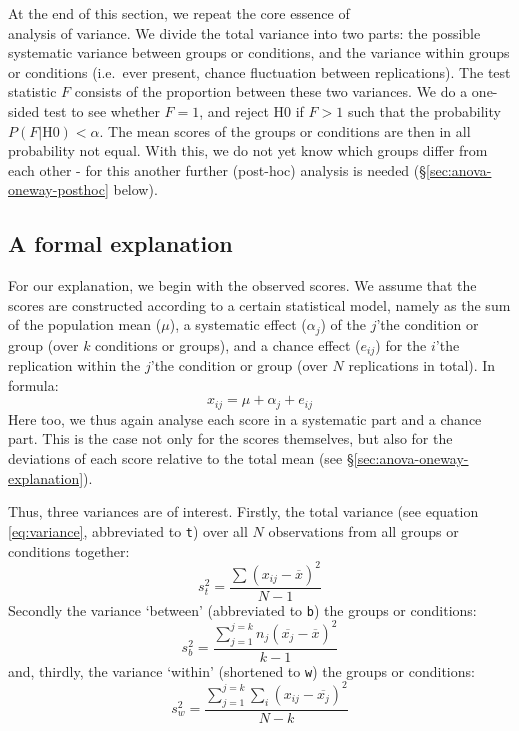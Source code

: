 \documentclass[
]{book}
\begin{document}
At the end of this section, we repeat the core essence of\\
analysis of variance. We divide the total variance into two parts: the
possible systematic variance between groups or conditions, and the
variance within groups or conditions (i.e.~ever present, chance
fluctuation between replications). The test statistic \(F\) consists of the
proportion between these two variances. We do a one-sided test to see
whether \(F=1\), and reject H0 if \(F>1\) such that the probability
\(P(F|\textrm{H0}) < \alpha\). The mean scores of the groups or conditions
are then in all probability not equal. With this, we do not yet know
which groups differ from each other - for this another further
(post-hoc) analysis is needed
(§\ref{sec:anova-oneway-posthoc} below).

\subsection{A formal explanation}\label{sec:anova-oneway-formal}

For our explanation, we begin with the observed scores. We assume that
the scores are constructed according to a certain statistical model, namely
as the sum of the population mean (\(\mu\)), a systematic
effect (\(\alpha_j\)) of the \(j\)'the condition or group (over \(k\) conditions
or groups), and a chance effect (\(e_{ij}\)) for the \(i\)'the replication within
the \(j\)'the condition or group (over \(N\) replications in
total). In formula:
\[x_{ij} = \mu + \alpha_{j} + e_{ij}\]
Here too, we thus again analyse each score in a systematic part and
a chance part. This is the case not only for the scores themselves, but also
for the deviations of each score relative to the total mean
(see §\ref{sec:anova-oneway-explanation}).

Thus, three variances are of interest. Firstly, the total
variance (see equation
\eqref{eq:variance}, abbreviated to \texttt{t}) over all \(N\)
observations from all groups or conditions together:
\begin{equation}
  \label{eq:MStotal}
    s^2_t = \frac{ \sum (x_{ij} - \overline{x})^2 } {N-1}
\end{equation}
Secondly the variance `between' (abbreviated to \texttt{b}) the groups
or conditions:
\begin{equation}
  \label{eq:MSbetween}
    s^2_b = \frac{ \sum_{j=1}^{j=k} n_j (\overline{x_j} - \overline{x})^2 } {k-1}
\end{equation}
and, thirdly, the variance `within' (shortened to \texttt{w}) the groups or
conditions:
\begin{equation}
  \label{eq:MSwithin}
    s^2_w = \frac{ \sum_{j=1}^{j=k} \sum_i (x_{ij} - \overline{x_j})^2 } {N-k}
\end{equation}
\end{document}
